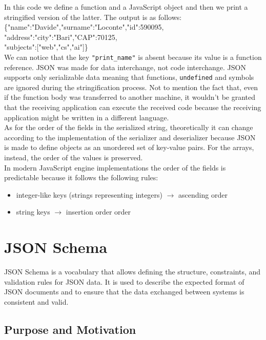 \documentclass{scrbook}
\begin{document}
	In this code we define a function and a JavaScript object and then we print a stringified version of the latter. The output is as follows:\\
	
	\{"name":"Davide","surname":"Loconte","id":590095,
	"address":{"city":"Bari","CAP":70125},\\
	"subjects":["web","cs","ai"]\}\\
	
	We can notice that the key \texttt{"print\_name"} is absent because its value is a function reference. JSON was made for data interchange, not code interchange. JSON supports only serializable data meaning that functions, \texttt{undefined} and symbols are ignored during the stringification process. Not to mention the fact that, even if the function body was transferred to another machine, it wouldn't be granted that the receiving application can execute the received code because the receiving application might be written in a different language.\\
	
	As for the order of the fields in the serialized string, theoretically it can change according to the implementation of the serializer and deserializer because JSON is made to define objects as an unordered set of key-value pairs. For the arrays, instead, the order of the values is preserved.\\
	
	In modern JavaScript engine implementations the order of the fields is predictable because it follows the following rules:
	\begin{itemize}
		\item integer-like keys (strings representing integers) $\rightarrow$ ascending order
		\item string keys $\rightarrow$ insertion order order
	\end{itemize}
	
	\section{JSON Schema}
	
	JSON Schema is a vocabulary that allows defining the structure, constraints, and validation rules for JSON data. It is used to describe the expected format of JSON documents and to ensure that the data exchanged between systems is consistent and valid.
	
	\subsection{Purpose and Motivation}
	
\end{document}
